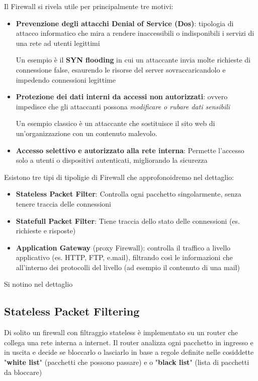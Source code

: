 Il Firewall si rivela utile per principalmente tre motivi:
\begin{itemize}
    \item \textbf{Prevenzione degli attacchi Denial of Service (Dos)}: tipologia di attacco informatico che mira a rendere inaccessibili o indisponibili i servizi di una rete ad utenti legittimi
    
    Un esempio è il \textbf{SYN flooding} in cui un attaccante invia molte richieste di connessione false, esaurendo le risorse del server sovraccaricandolo e impedendo connessioni legittime

    \item \textbf{Protezione dei dati interni da accessi non autorizzati}: ovvero impedisce che gli attaccanti possona \textit{modificare o rubare dati sensibili}
    
    Un esempio classico è un attaccante che sostituisce il sito web di un'organizzazione con un contenuto malevolo.

    \item \textbf{Accesso selettivo e autorizzato alla rete interna}: Permette l’accesso solo a utenti o dispositivi autenticati, migliorando la sicurezza
\end{itemize}

Esistono tre tipi di tipoligie di Firewall che approfonoidremo nel dettaglio:
\begin{itemize}
    \item \textbf{Stateless Packet Filter}: Controlla ogni pacchetto singolarmente, senza tenere traccia delle connessioni
    \item \textbf{Statefull Packet Filter}: Tiene traccia dello stato delle connessioni (es. richieste e risposte)  
    \item \textbf{Application Gateway} (proxy Firewall): controlla il traffico a livello applicativo (es. HTTP, FTP, e.mail), filtrando così le informazioni che all'interno dei protocolli del livello (ad esempio il contenuto di una mail)
\end{itemize}

Si notino nel dettaglio
\subsection{Stateless Packet Filtering}

Di solito un firewall con filtraggio stateless è implementato su un router che collega una rete interna a internet. Il router analizza ogni pacchetto in ingresso e in uscita e decide se bloccarlo o lasciarlo in base a regole definite nelle cosiddette "\textbf{white list}" (pacchetti che possono passare) e o "\textbf{black list}" (lista di pacchetti da bloccare)

